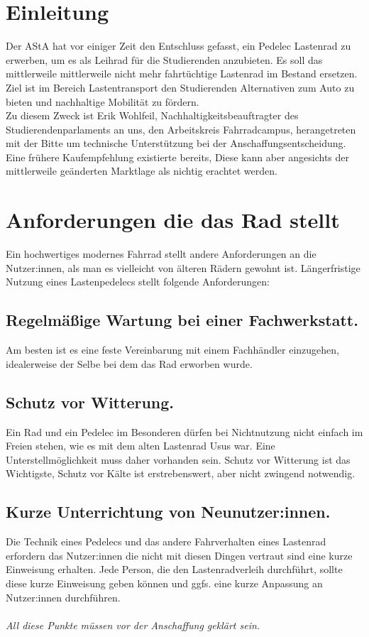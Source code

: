 \documentclass[a4paper,ngerman, 14pt] {scrartcl}
\begin{document}
\tableofcontents
\newpage
\section{Einleitung}
Der AStA hat vor einiger Zeit den Entschluss gefasst, ein Pedelec Lastenrad zu erwerben, um es als Leihrad für die Studierenden anzubieten. Es soll das mittlerweile mittlerweile nicht mehr fahrtüchtige Lastenrad im Bestand ersetzen. Ziel ist im Bereich Lastentransport den Studierenden Alternativen zum Auto zu bieten und nachhaltige Mobilität zu fördern.\\
Zu diesem Zweck ist Erik Wohlfeil, Nachhaltigkeitsbeauftragter des Studierendenparlaments an uns, den Arbeitskreis Fahrradcampus, herangetreten mit der Bitte um technische Unterstützung bei der Anschaffungsentscheidung. Eine frühere Kaufempfehlung existierte bereits, Diese kann aber angesichts der mittlerweile geänderten Marktlage als nichtig erachtet werden.\\


\section{Anforderungen die das Rad stellt}
Ein hochwertiges modernes Fahrrad stellt andere Anforderungen an die Nutzer:innen, als man es vielleicht von älteren Rädern gewohnt ist. Längerfristige Nutzung eines Lastenpedelecs stellt folgende Anforderungen:\\

\subsection{Regelmäßige Wartung bei einer Fachwerkstatt.} Am besten ist es eine feste Vereinbarung mit einem Fachhändler einzugehen, idealerweise der Selbe bei dem das Rad erworben wurde.

\subsection{Schutz vor Witterung.} Ein Rad und ein Pedelec im Besonderen dürfen bei Nichtnutzung nicht einfach im Freien stehen, wie es mit dem alten Lastenrad Usus war. Eine Unterstellmöglichkeit muss daher vorhanden sein. Schutz vor Witterung ist das Wichtigste, Schutz vor Kälte ist erstrebenswert, aber nicht zwingend notwendig.

\subsection{Kurze Unterrichtung von Neunutzer:innen.} Die Technik eines Pedelecs und das andere Fahrverhalten eines Lastenrad erfordern das Nutzer:innen die nicht mit diesen Dingen vertraut sind eine kurze Einweisung erhalten. Jede Person, die den Lastenradverleih durchführt, sollte diese kurze Einweisung geben können und ggfs. eine kurze Anpassung an Nutzer:innen durchführen.\\
\vspace{2mm}\\
\textit{All diese Punkte müssen vor der Anschaffung geklärt sein.}
\end{document}
